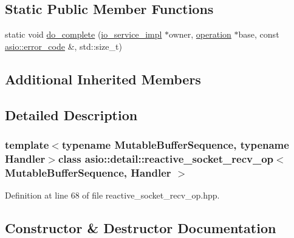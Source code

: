 \subsection*{Static Public Member Functions}
\begin{DoxyCompactItemize}
\item 
static void \hyperlink{classasio_1_1detail_1_1reactive__socket__recv__op_a5ab5d8e88729220a2c95452b9996fe7a}{do\+\_\+complete} (\hyperlink{namespaceasio_1_1detail_a6d61d9b8e53c11288be549d82aec5a42}{io\+\_\+service\+\_\+impl} $\ast$owner, \hyperlink{namespaceasio_1_1detail_a338968609bec20e37145309f8f9ec936}{operation} $\ast$base, const \hyperlink{classasio_1_1error__code}{asio\+::error\+\_\+code} \&, std\+::size\+\_\+t)
\end{DoxyCompactItemize}
\subsection*{Additional Inherited Members}


\subsection{Detailed Description}
\subsubsection*{template$<$typename Mutable\+Buffer\+Sequence, typename Handler$>$class asio\+::detail\+::reactive\+\_\+socket\+\_\+recv\+\_\+op$<$ Mutable\+Buffer\+Sequence, Handler $>$}



Definition at line 68 of file reactive\+\_\+socket\+\_\+recv\+\_\+op.\+hpp.



\subsection{Constructor \& Destructor Documentation}
\hypertarget{classasio_1_1detail_1_1reactive__socket__recv__op_a15c5dc4ad1331f8c1296c969b0030d66}{}
